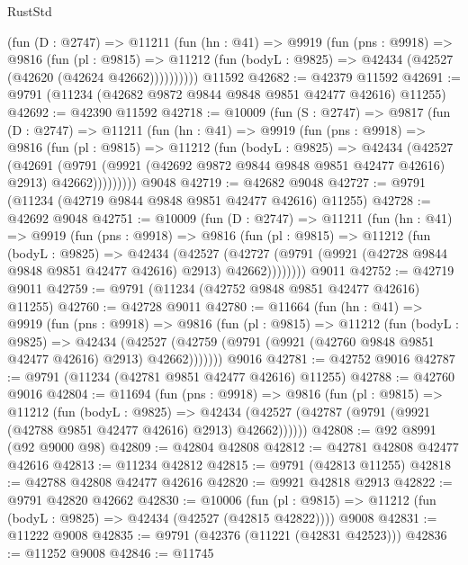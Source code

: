 \begin{lexlean}{RustStd}
\begin{coremodule}
        (fun (D : @2747) =>
        @11211
          (fun (hn : @41) =>
          @9919
            (fun (pns : @9918) =>
            @9816
              (fun (pl : @9815) =>
              @11212 (fun (bodyL : @9825) => @42434 (@42527 (@42620 (@42624 @42662))))))))))
    @11592
@42682 := @42379 @11592
@42691 := @9791 (@11234 (@42682 @9872 @9844 @9848 @9851 @42477 @42616) @11255)
@42692 := @42390 @11592
@42718 := @10009
    (fun (S : @2747) =>
    @9817
      (fun (D : @2747) =>
      @11211
        (fun (hn : @41) =>
        @9919
          (fun (pns : @9918) =>
          @9816
            (fun (pl : @9815) =>
            @11212
              (fun (bodyL : @9825) =>
              @42434
                (@42527
                  (@42691
                    (@9791
                      (@9921 (@42692 @9872 @9844 @9848 @9851 @42477 @42616) @2913)
                      @42662)))))))))
    @9048
@42719 := @42682 @9048
@42727 := @9791 (@11234 (@42719 @9844 @9848 @9851 @42477 @42616) @11255)
@42728 := @42692 @9048
@42751 := @10009
    (fun (D : @2747) =>
    @11211
      (fun (hn : @41) =>
      @9919
        (fun (pns : @9918) =>
        @9816
          (fun (pl : @9815) =>
          @11212
            (fun (bodyL : @9825) =>
            @42434
              (@42527
                (@42727 (@9791 (@9921 (@42728 @9844 @9848 @9851 @42477 @42616) @2913) @42662))))))))
    @9011
@42752 := @42719 @9011
@42759 := @9791 (@11234 (@42752 @9848 @9851 @42477 @42616) @11255)
@42760 := @42728 @9011
@42780 := @11664
    (fun (hn : @41) =>
    @9919
      (fun (pns : @9918) =>
      @9816
        (fun (pl : @9815) =>
        @11212
          (fun (bodyL : @9825) =>
          @42434
            (@42527 (@42759 (@9791 (@9921 (@42760 @9848 @9851 @42477 @42616) @2913) @42662)))))))
    @9016
@42781 := @42752 @9016
@42787 := @9791 (@11234 (@42781 @9851 @42477 @42616) @11255)
@42788 := @42760 @9016
@42804 := @11694
    (fun (pns : @9918) =>
    @9816
      (fun (pl : @9815) =>
      @11212
        (fun (bodyL : @9825) =>
        @42434 (@42527 (@42787 (@9791 (@9921 (@42788 @9851 @42477 @42616) @2913) @42662))))))
@42808 := @92 @8991 (@92 @9000 @98)
@42809 := @42804 @42808
@42812 := @42781 @42808 @42477 @42616
@42813 := @11234 @42812
@42815 := @9791 (@42813 @11255)
@42818 := @42788 @42808 @42477 @42616
@42820 := @9921 @42818 @2913
@42822 := @9791 @42820 @42662
@42830 := @10006
    (fun (pl : @9815) => @11212 (fun (bodyL : @9825) => @42434 (@42527 (@42815 @42822))))
    @9008
@42831 := @11222 @9008
@42835 := @9791 (@42376 (@11221 (@42831 @42523)))
@42836 := @11252 @9008
@42846 := @11745

\end{coremodule}
\end{lexlean}
